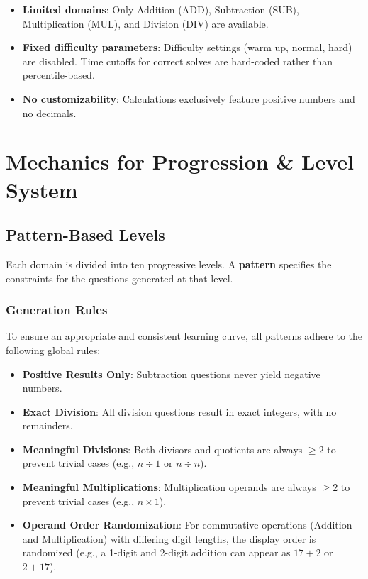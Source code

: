 \documentclass[11pt]{article}
\begin{document}
\begin{itemize}[leftmargin=*]
    \item \textbf{Limited domains}: Only Addition (ADD), Subtraction (SUB), Multiplication (MUL), and Division (DIV) are available.
    \item \textbf{Fixed difficulty parameters}: Difficulty settings (warm up, normal, hard) are disabled. Time cutoffs for correct solves are hard-coded rather than percentile-based.
    \item \textbf{No customizability}: Calculations exclusively feature positive numbers and no decimals.
\end{itemize}

\section{Mechanics for Progression \& Level System}

\subsection{Pattern-Based Levels}

Each domain is divided into ten progressive levels. A \textbf{pattern} specifies the constraints for the questions generated at that level.

\subsubsection*{Generation Rules}
To ensure an appropriate and consistent learning curve, all patterns adhere to the following global rules:
\begin{itemize}[leftmargin=*]
  \item \textbf{Positive Results Only}: Subtraction questions never yield negative numbers.
  \item \textbf{Exact Division}: All division questions result in exact integers, with no remainders.
  \item \textbf{Meaningful Divisions}: Both divisors and quotients are always $\ge 2$ to prevent trivial cases (e.g., $n \div 1$ or $n \div n$).
  \item \textbf{Meaningful Multiplications}: Multiplication operands are always $\ge 2$ to prevent trivial cases (e.g., $n \times 1$).
  \item \textbf{Operand Order Randomization}: For commutative operations (Addition and Multiplication) with differing digit lengths, the display order is randomized (e.g., a 1-digit and 2-digit addition can appear as $17+2$ or $2+17$).
\end{itemize}
\end{document}
